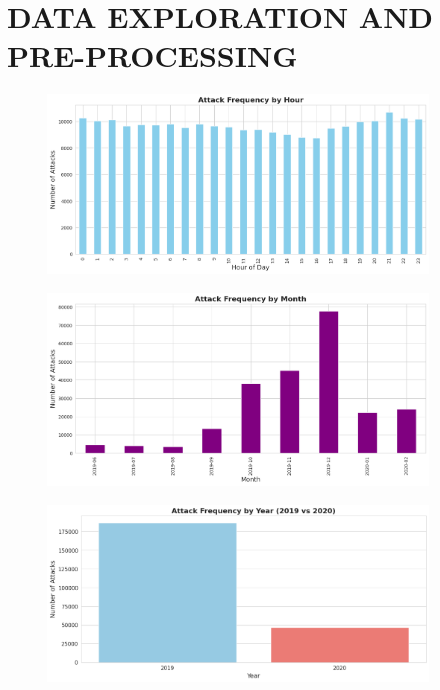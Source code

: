 
\vspace{-1.25cm}

\section{DATA EXPLORATION AND PRE-PROCESSING}

    
    \begin{figure}[H]
        \centering
        \includegraphics[width=0.9\textwidth]{../figures/plots/section1/attack_frequency_by_hour.png}
        \caption{}
        \label{fig:}
    \end{figure}
    
    \begin{figure}[H]
        \centering
        \includegraphics[width=0.9\textwidth]{../figures/plots/section1/attack_frequency_by_month.png}
        \caption{}
        \label{fig:}
    \end{figure}
    
    \begin{figure}[H]
        \centering
        \includegraphics[width=0.9\textwidth]{../figures/plots/section1/attack_frequency_by_year.png}
        \caption{}
        \label{fig:}
    \end{figure}
    
